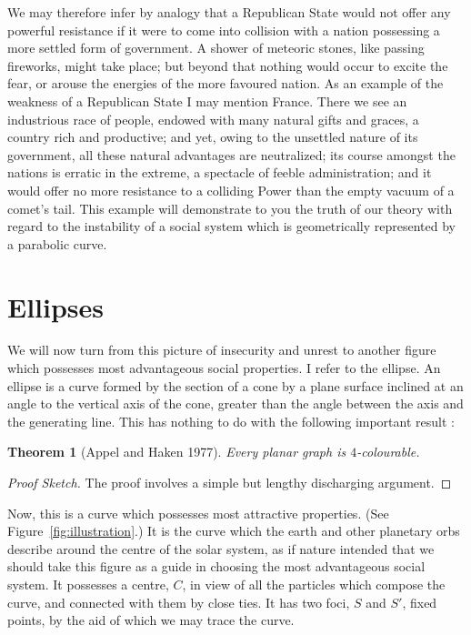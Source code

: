 \documentclass[draft]{jocg}
\theoremstyle{plain}
\newtheorem{theorem}{Theorem}
\theoremstyle{definition}
\begin{document}
We may therefore infer by analogy that a Republican State would not
offer any powerful resistance if it were to come into collision with
a nation possessing a more settled form of government. A shower of
meteoric stones, like passing fireworks, might take place; but beyond
that nothing would occur to excite the fear, or arouse the energies of
the more favoured nation. As an example of the weakness of a Republican
State I may mention France. There we see an industrious race of people,
endowed with many natural gifts and graces, a country rich and productive;
and yet, owing to the unsettled nature of its government, all these
natural advantages are neutralized; its course amongst the nations is
erratic in the extreme, a spectacle of feeble  administration; and it
would offer no more resistance to a colliding Power than the empty vacuum
of a comet's tail. This example will demonstrate to you the truth of
our theory with regard to the instability of a social system which is
geometrically represented by a parabolic curve.

\section{Ellipses}

We will now turn from this picture of insecurity and unrest to another
figure which possesses most advantageous social properties. I refer to
the ellipse. An ellipse is a curve formed by the section of a cone by
a plane surface inclined at an angle to the vertical axis of the cone,
greater than the angle between the axis and the generating line.  This has
nothing to do with the following important result \cite{ah77,rsst97}:

\begin{theorem}[Appel and Haken 1977]
  Every planar graph is $4$-colourable.
\end{theorem} 

\begin{proof}[Proof Sketch]
The proof involves a simple but lengthy discharging argument.
\end{proof}

Now, this is a curve which possesses most attractive properties. (See
Figure~\ref{fig:illustration}.) It is the curve which the earth and
other planetary orbs describe around the centre of the solar system,
as if nature intended that we should take this figure as a guide in
choosing the most advantageous social system. It possesses a centre,
$C$, in view of all the particles which compose the curve, and connected
with them by close  ties. It has two foci, $S$ and $S'$, fixed points,
by the aid of which we may trace the curve.
\end{document}
